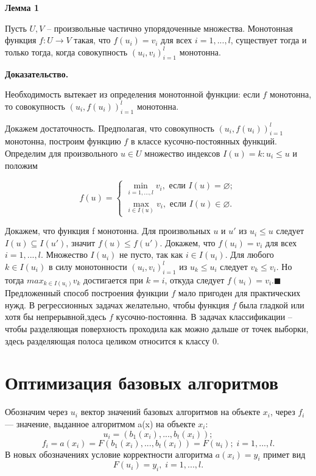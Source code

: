 \documentclass[a4paper,12pt]{article}
\begin{document}
 \textbf{Лемма 1}
 
Пусть  $U, V$ -- произвольные частично упорядоченные множества. Монотонная функция $f : U \longrightarrow V$ такая, что $f(u_i) = v_i$ для всех $i = 1, . . . , l$, существует
тогда и только тогда, когда совокупность $(u_i
, v_i)^l_{i=1}$ монотонна.

\textbf{Доказательство.}

Необходимость вытекает из определения монотонной функции: если $f$ монотонна, то совокупность $(u_i,f(u_i))^l_{i=1}$ монотонна.

Докажем достаточность. Предполагая, что совокупность $(u_i,f(u_i))^l_{i=1}$ монотонна,
построим функцию $f$ в классе кусочно-постоянных функций. Определим для произвольного $u \in U $ множество индексов $I(u) = {k : u_i \leq u}$ и положим

\begin{equation*}
    f(u) =
    \begin{cases}
        \min\limits_{i=1,...,l}v_i, \text{ если } I(u) = \varnothing; \\
        \max\limits_{i\in I(u)}v_i, \text{ если } I(u) \in \varnothing .
    \end{cases}
\end{equation*}


Докажем, что функция f монотонна. Для произвольных $u$ и $u\prime $ из $u_i \leq u$ следует $I(u)\subseteq I( u\prime)$, значит $f(u)\leq f(u\prime )$.
Докажем, что $f(u_i) = v_i$ для всех $i = 1, . . . , l$. Множество $I(u_i)$ не пусто, так
как $i \in I(u_i)$. Для любого $k \in I(u_i)$ в силу монотонности $(u_i, v_i)^l_{i=1}$ из $u_k \leq u_i$ следует $v_k \leq v_i$. Но тогда $max_{k\in I(u_i)} v_k$ достигается при $k = i$, откуда следует $f(u_i) = v_i$.$\blacksquare$\\




Предложенный способ построения функции $f$ мало пригоден для практических нужд.
 В регрессионных задачах желательно, чтобы функция $f$ была гладкой или хотя бы непрерывной,здесь  $f$ кусочно-постоянна. В задачах классификации  -- чтобы разделяющая поверхность проходила как можно дальше от точек выборки, здесь разделяющая полоса целиком относится к классу 0.


\section{Оптимизация базовых алгоритмов}

Обозначим через $u_i$ вектор значений базовых алгоритмов на объекте $x_i$, через $f_i$ — значение, выданное алгоритмом a(x) на объекте $x_i$:
\[u_i = (b_1(x_i), . . . , b_t(x_i));\]
\[f_i = a(x_i) = F(b_1(x_i), . . . , b_t(x_i)) = F(u_i); \; i = 1, . . . , l.\]
В новых обозначениях условие корректности алгоритма $a(x_i) = y_i$ примет вид
\[F(u_i) = y_i
, \; i = 1, . . . , l. 
\]\\
\end{document}
